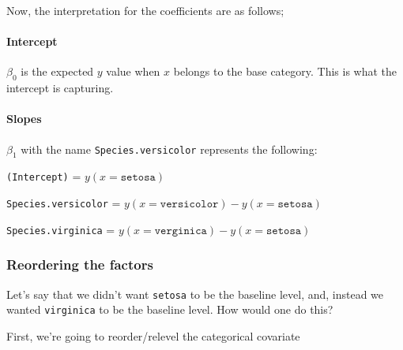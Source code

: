 \documentclass[
  letterpaper,
  DIV=11,
  numbers=noendperiod]{scrartcl}
\let\oldparagraph\paragraph
\renewcommand{\paragraph}[1]{\oldparagraph{#1}\mbox{}}
\newenvironment{Shaded}{\begin{snugshade}}{\end{snugshade}}
\newcommand{\NormalTok}[1]{\textcolor[rgb]{0.00,0.23,0.31}{#1}}
\newcommand{\SpecialCharTok}[1]{\textcolor[rgb]{0.37,0.37,0.37}{#1}}
\begin{document}
Now, the interpretation for the coefficients are as follows;

\hypertarget{intercept}{%
\paragraph{Intercept}\label{intercept}}

\(\beta_0\) is the expected \(y\) value when \(x\) belongs to the base
category. This is what the intercept is capturing.

\hypertarget{slopes}{%
\paragraph{Slopes}\label{slopes}}

\(\beta_1\) with the name \texttt{Species.versicolor} represents the
following:

\texttt{(Intercept)} = \(y(x = \texttt{setosa})\)

\texttt{Species.versicolor} =
\(y(x = \texttt{versicolor}) - y(x = \texttt{setosa})\)

\texttt{Species.virginica} =
\(y(x = \texttt{verginica}) - y(x = \texttt{setosa})\)

\hypertarget{reordering-the-factors}{%
\subsubsection{Reordering the factors}\label{reordering-the-factors}}

Let's say that we didn't want \texttt{setosa} to be the baseline level,
and, instead we wanted \texttt{virginica} to be the baseline level. How
would one do this?

First, we're going to reorder/relevel the categorical covariate

\begin{Shaded}
\end{Shaded}
\end{document}
